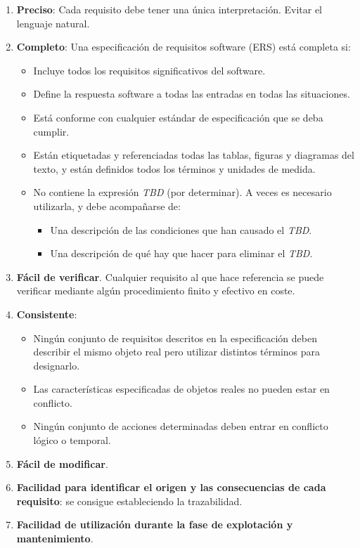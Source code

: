 \begin{enumerate}
    \item \textbf{Preciso}: Cada requisito debe tener una única interpretación. Evitar el lenguaje natural.
    \item \textbf{Completo}: Una especificación de requisitos software (ERS) está completa si:
    \begin{itemize}
        \item Incluye todos los requisitos significativos del software.
        \item Define la respuesta software a todas las entradas en todas las situaciones.
        \item Está conforme con cualquier estándar de especificación que se deba cumplir.
        \item Están etiquetadas y referenciadas todas las tablas, figuras y diagramas del texto, y están definidos todos los términos y unidades de medida.
        \item No contiene la expresión \textit{TBD} (por determinar). A veces es necesario utilizarla, y debe acompañarse de:
        \begin{itemize}
            \item Una descripción de las condiciones que han causado el \textit{TBD}.
            \item Una descripción de qué hay que hacer para eliminar el \textit{TBD}.
        \end{itemize}
    \end{itemize}
    \item \textbf{Fácil de verificar}. Cualquier requisito al que hace referencia se puede verificar mediante algún procedimiento finito y efectivo en coste.
    \item \textbf{Consistente}: %
    \begin{itemize}
        \item Ningún conjunto de requisitos descritos en la especificación deben describir el mismo objeto real pero utilizar distintos términos para designarlo.
        \item Las características especificadas de objetos reales no pueden estar en conflicto.
        \item Ningún conjunto de acciones determinadas deben entrar en conflicto lógico o temporal.
    \end{itemize}
    \item \textbf{Fácil de modificar}.

    \item \textbf{Facilidad para identificar el origen y las consecuencias de cada requisito}: se consigue estableciendo la trazabilidad.
    
    \item \textbf{Facilidad de utilización durante la fase de explotación y mantenimiento}. %

\end{enumerate}





